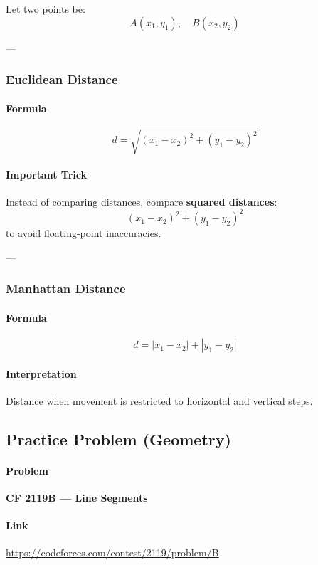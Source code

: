 \documentclass[11pt]{article}
\begin{document}
Let two points be:
\[
A(x_1, y_1), \quad B(x_2, y_2)
\]

---

\subsubsection{Euclidean Distance}

\paragraph{Formula}
\[
d = \sqrt{(x_1 - x_2)^2 + (y_1 - y_2)^2}
\]

\paragraph{Important Trick}
Instead of comparing distances, compare \textbf{squared distances}:
\[
(x_1 - x_2)^2 + (y_1 - y_2)^2
\]
to avoid floating-point inaccuracies.

---

\subsubsection{Manhattan Distance}

\paragraph{Formula}
\[
d = |x_1 - x_2| + |y_1 - y_2|
\]

\paragraph{Interpretation}
Distance when movement is restricted to horizontal and vertical steps.

\subsection{Practice Problem (Geometry)}

\paragraph{Problem}
\textbf{CF 2119B — Line Segments}

\paragraph{Link}
\url{https://codeforces.com/contest/2119/problem/B}
\end{document}
